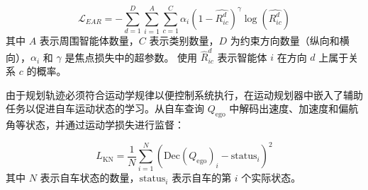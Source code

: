 \begin{equation}
    \mathcal{L}_{EAR} = - \sum_{d=1}^D\sum_{i=1}^A\sum_{c=1}^C\alpha_i(1-\hat{R^d_{ic}})^\gamma \log(\hat{R^d_{ic}})
\end{equation}
其中 $A$ 表示周围智能体数量，$C$ 表示类别数量，$D$ 为约束方向数量（纵向和横向），$\alpha_i$ 和 $\gamma$ 是焦点损失中的超参数。
使用 \(\hat{R}^d_{ic}\) 表示智能体 $i$ 在方向 $d$ 上属于关系 $c$ 的概率。

由于规划轨迹必须符合运动学规律以便控制系统执行，在运动规划器中嵌入了辅助任务以促进自车运动状态的学习。从自车查询 $Q_{\text{ego}}$ 中解码出速度、加速度和偏航角等状态，并通过运动学损失进行监督：

\begin{equation}
    L_{\text{KN}} = \frac{1}{N} \sum_{i=1}^{N} \left(\textrm{Dec}(Q_{\text{ego}})_i - \text{status}_i\right)^2
\end{equation}
其中 $N$ 表示自车状态的数量，$\text{status}_i$ 表示自车的第 $i$ 个实际状态。
